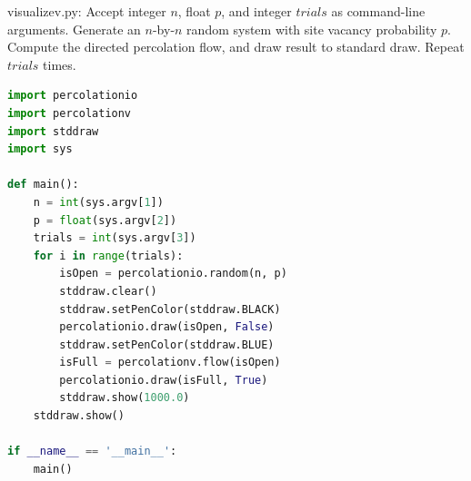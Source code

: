 \documentclass[8pt,a4paper,compress]{beamer}
\begin{document}
\begin{frame}[fragile]
\pause

\begin{framed}
\tiny visualizev.py: Accept integer $n$, float $p$, and integer $trials$ as command-line arguments. Generate an $n$-by-$n$ random system with site vacancy probability $p$. Compute the directed percolation flow, and draw result to standard draw. Repeat $trials$ times.
\end{framed}

\begin{lstlisting}[language=Python,style=focusin]
import percolationio
import percolationv
import stddraw
import sys

def main():
    n = int(sys.argv[1])
    p = float(sys.argv[2])
    trials = int(sys.argv[3])
    for i in range(trials):
        isOpen = percolationio.random(n, p)
        stddraw.clear()
        stddraw.setPenColor(stddraw.BLACK)
        percolationio.draw(isOpen, False)
        stddraw.setPenColor(stddraw.BLUE)
        isFull = percolationv.flow(isOpen)
        percolationio.draw(isFull, True)
        stddraw.show(1000.0)
    stddraw.show()

if __name__ == '__main__':
    main()
\end{lstlisting}
\end{frame}
\end{document}
